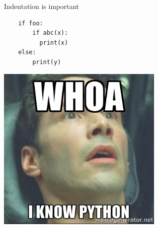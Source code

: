 \documentclass{beamer}
\begin{document}
\begin{frame}[fragile]{Indentation is important}
\begin{verbatim}
	if foo:
	    if abc(x):
	      print(x)
	else:
	    print(y)
\end{verbatim}
\end{frame}

\begin{frame}
	\begin{center}
		\includegraphics[width=0.6\textwidth]{./img/neo.jpg}
	\end{center}
\end{frame}
\end{document}
